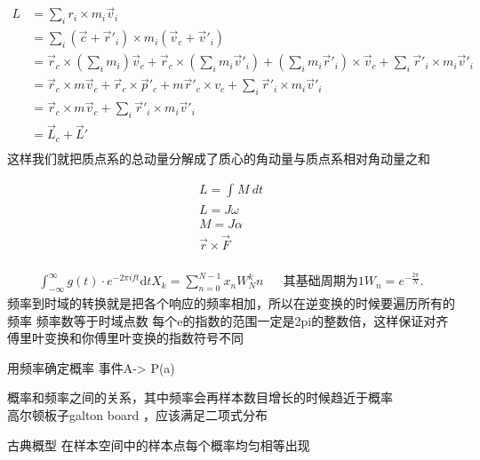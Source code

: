\begin{thm}[质点系角动量的分解]
\begin{align*}
		L &= \sum_{i}^{} r_i \times m_i\vec v_i\\
		&= \sum_{i}^{}(\vec c+ \vec r'_i)\times m_i(\vec v_c+\vec v'_i) \\
		&= \vec r_c\times (\sum_i m_i)\vec v_c+ \vec r_c\times (\sum_im_i\vec v'_i)+(\sum_im_i\vec r'_i)\times \vec v_c+\sum_i\vec r'_i\times m_i\vec v'_i\\
		&= \vec r_c\times m\vec v_c+\vec r_c\times \vec p'_c+m\vec r'_c\times v_c+\sum_i\vec r'_i\times m_i\vec v'_i \\
		&= \vec r_c\times m\vec v_c + \sum_i\vec r'_i\times m_i\vec v'_i \\
		&= \vec L_c + \vec L' \\
\end{align*}
这样我们就把质点系的总动量分解成了质心的角动量与质点系相对角动量之和
\end{thm}
\begin{thm}
\begin{align*}
		L = \int_{{}}^{{}} {M} \: d{t} {}\\
		L = J\omega \\
		M = J \alpha \\
		\vec r\times \vec F\\
\end{align*}
\end{thm}
\begin{thm}[快速傅里叶变换]
	\begin{align*}
			\int_{-\infty}^{\infty}  g(t)\cdot  e^{-2\pi i ft } \mathrm{d}t  
			X_k = \sum_{n=0}^{N-1} x_nW_N^kn  && \text{其基础周期为1}W_n = e^{-\frac{2\pi}{N} }
	.\end{align*}
	频率到时域的转换就是把各个响应的频率相加，所以在逆变换的时候要遍历所有的频率
	频率数等于时域点数
	每个e的指数的范围一定是2pi的整数倍，这样保证对齐
	傅里叶变换和你傅里叶变换的指数符号不同 
\end{thm}
\begin{thm}
		用频率确定概率
		事件A-> P(a)

概率和频率之间的关系，其中频率会再样本数目增长的时候趋近于概率\\
	高尔顿板子galton board ，应该满足二项式分布

	古典概型
	在样本空间中的样本点每个概率均匀相等出现
\end{thm}
